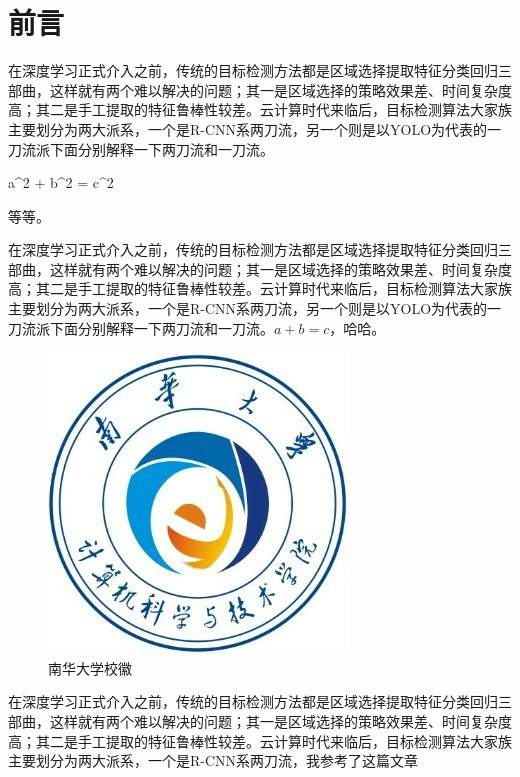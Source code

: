 \section{前言}
在深度学习正式介入之前，传统的目标检测方法都是区域选择提取特征分类回归三部曲，这样就有两个难以解决的问题；其一是区域选择的策略效果差、时间复杂度高；其二是手工提取的特征鲁棒性较差。云计算时代来临后，目标检测算法大家族主要划分为两大派系，一个是R-CNN系两刀流，另一个则是以YOLO为代表的一刀流派下面分别解释一下两刀流和一刀流。 
\begin{uscequation}
	a^2 + b^2 = c^2 
\end{uscequation}
等等。

在深度学习正式介入之前，传统的目标检测方法都是区域选择提取特征分类回归三部曲，这样就有两个难以解决的问题；其一是区域选择的策略效果差、时间复杂度高；其二是手工提取的特征鲁棒性较差。云计算时代来临后，目标检测算法大家族主要划分为两大派系，一个是R-CNN系两刀流，另一个则是以YOLO为代表的一刀流派下面分别解释一下两刀流和一刀流。$a + b = c$，哈哈。


\setcounter{figure}{0}
\begin{figure}[h]
	\centering
	\includegraphics{./Pictures/usc.png}	
	\caption{南华大学校徽}	
\end{figure}
在深度学习正式介入之前，传统的目标检测方法都是区域选择提取特征分类回归三部曲，这样就有两个难以解决的问题；其一是区域选择的策略效果差、时间复杂度高；其二是手工提取的特征鲁棒性较差。云计算时代来临后，目标检测算法大家族主要划分为两大派系，一个是R-CNN系两刀流，我参考了这篇文章\cite{girshick2014rich}	

